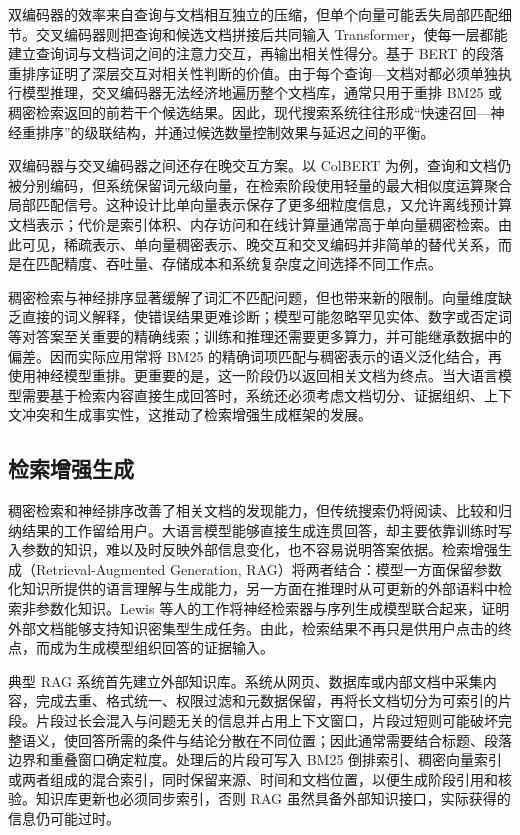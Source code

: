 双编码器的效率来自查询与文档相互独立的压缩，但单个向量可能丢失局部匹配细节。交叉编码器则把查询和候选文档拼接后共同输入 Transformer，使每一层都能建立查询词与文档词之间的注意力交互，再输出相关性得分。基于 BERT 的段落重排序证明了深层交互对相关性判断的价值\parencite{nogueira2019bert}。由于每个查询—文档对都必须单独执行模型推理，交叉编码器无法经济地遍历整个文档库，通常只用于重排 BM25 或稠密检索返回的前若干个候选结果。因此，现代搜索系统往往形成“快速召回—神经重排序”的级联结构，并通过候选数量控制效果与延迟之间的平衡。

双编码器与交叉编码器之间还存在晚交互方案。以 ColBERT 为例，查询和文档仍被分别编码，但系统保留词元级向量，在检索阶段使用轻量的最大相似度运算聚合局部匹配信号\parencite{khattab2020colbert}。这种设计比单向量表示保存了更多细粒度信息，又允许离线预计算文档表示；代价是索引体积、内存访问和在线计算量通常高于单向量稠密检索。由此可见，稀疏表示、单向量稠密表示、晚交互和交叉编码并非简单的替代关系，而是在匹配精度、吞吐量、存储成本和系统复杂度之间选择不同工作点。

稠密检索与神经排序显著缓解了词汇不匹配问题，但也带来新的限制。向量维度缺乏直接的词义解释，使错误结果更难诊断；模型可能忽略罕见实体、数字或否定词等对答案至关重要的精确线索；训练和推理还需要更多算力，并可能继承数据中的偏差。因而实际应用常将 BM25 的精确词项匹配与稠密表示的语义泛化结合，再使用神经模型重排。更重要的是，这一阶段仍以返回相关文档为终点。当大语言模型需要基于检索内容直接生成回答时，系统还必须考虑文档切分、证据组织、上下文冲突和生成事实性，这推动了检索增强生成框架的发展。

\subsection{检索增强生成}

稠密检索和神经排序改善了相关文档的发现能力，但传统搜索仍将阅读、比较和归纳结果的工作留给用户。大语言模型能够直接生成连贯回答，却主要依靠训练时写入参数的知识，难以及时反映外部信息变化，也不容易说明答案依据。检索增强生成（Retrieval-Augmented Generation, RAG）将两者结合：模型一方面保留参数化知识所提供的语言理解与生成能力，另一方面在推理时从可更新的外部语料中检索非参数化知识。Lewis 等人的工作将神经检索器与序列生成模型联合起来，证明外部文档能够支持知识密集型生成任务\parencite{lewis2020rag}。由此，检索结果不再只是供用户点击的终点，而成为生成模型组织回答的证据输入。

典型 RAG 系统首先建立外部知识库。系统从网页、数据库或内部文档中采集内容，完成去重、格式统一、权限过滤和元数据保留，再将长文档切分为可索引的片段。片段过长会混入与问题无关的信息并占用上下文窗口，片段过短则可能破坏完整语义，使回答所需的条件与结论分散在不同位置；因此通常需要结合标题、段落边界和重叠窗口确定粒度。处理后的片段可写入 BM25 倒排索引、稠密向量索引或两者组成的混合索引，同时保留来源、时间和文档位置，以便生成阶段引用和核验。知识库更新也必须同步索引，否则 RAG 虽然具备外部知识接口，实际获得的信息仍可能过时。

